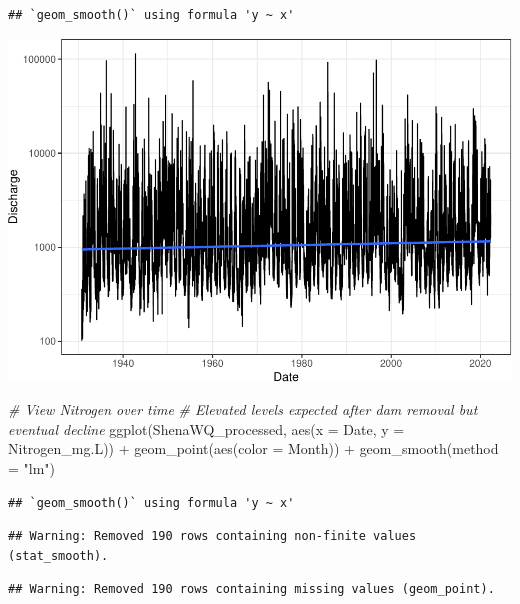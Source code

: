 \documentclass[
  12pt,
]{article}
\newenvironment{Shaded}{\begin{snugshade}}{\end{snugshade}}
\newcommand{\AttributeTok}[1]{\textcolor[rgb]{0.77,0.63,0.00}{#1}}
\newcommand{\CommentTok}[1]{\textcolor[rgb]{0.56,0.35,0.01}{\textit{#1}}}
\newcommand{\FunctionTok}[1]{\textcolor[rgb]{0.00,0.00,0.00}{#1}}
\newcommand{\NormalTok}[1]{#1}
\newcommand{\SpecialCharTok}[1]{\textcolor[rgb]{0.00,0.00,0.00}{#1}}
\newcommand{\StringTok}[1]{\textcolor[rgb]{0.31,0.60,0.02}{#1}}
\begin{document}
\begin{verbatim}
## `geom_smooth()` using formula 'y ~ x'
\end{verbatim}

\includegraphics{Project_Template_files/figure-latex/unnamed-chunk-1-1.pdf}

\begin{Shaded}
\begin{Highlighting}[]
\CommentTok{\# View Nitrogen over time}
\CommentTok{\# Elevated levels expected after dam removal but eventual decline}
\FunctionTok{ggplot}\NormalTok{(ShenaWQ\_processed, }\FunctionTok{aes}\NormalTok{(}\AttributeTok{x =}\NormalTok{ Date, }\AttributeTok{y =}\NormalTok{ Nitrogen\_mg.L)) }\SpecialCharTok{+}
  \FunctionTok{geom\_point}\NormalTok{(}\FunctionTok{aes}\NormalTok{(}\AttributeTok{color =}\NormalTok{ Month)) }\SpecialCharTok{+}
  \FunctionTok{geom\_smooth}\NormalTok{(}\AttributeTok{method =} \StringTok{"lm"}\NormalTok{) }
\end{Highlighting}
\end{Shaded}

\begin{verbatim}
## `geom_smooth()` using formula 'y ~ x'
\end{verbatim}

\begin{verbatim}
## Warning: Removed 190 rows containing non-finite values (stat_smooth).
\end{verbatim}

\begin{verbatim}
## Warning: Removed 190 rows containing missing values (geom_point).
\end{verbatim}
\end{document}
